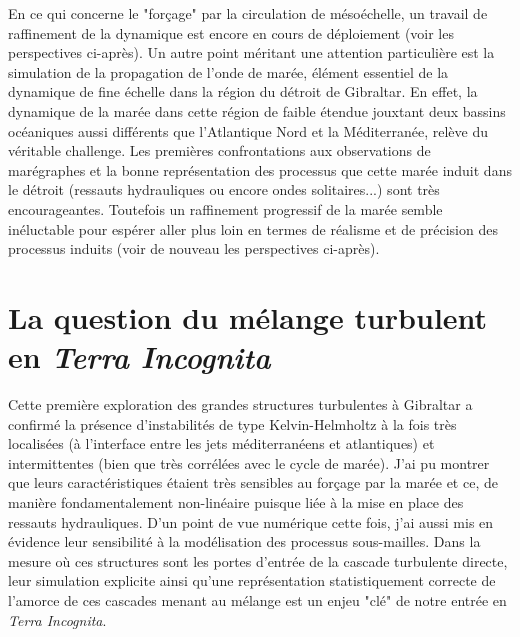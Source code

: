 En ce qui concerne le "forçage" par la circulation de mésoéchelle, un travail de raffinement de la dynamique est encore en cours de déploiement (voir les perspectives ci-après). Un autre point méritant une attention particulière est la simulation de la propagation de l'onde de marée, élément essentiel de la dynamique de fine échelle dans la région du détroit de Gibraltar. En effet, la dynamique de la marée dans cette région de faible étendue jouxtant deux bassins océaniques aussi différents que l'Atlantique Nord et la Méditerranée, relève du véritable challenge. Les premières confrontations aux observations de marégraphes et la bonne représentation des processus que cette marée induit dans le détroit (ressauts hydrauliques ou encore ondes solitaires...) sont très encourageantes. Toutefois un raffinement progressif de la marée semble inéluctable pour espérer aller plus loin en termes de réalisme et de précision des processus induits (voir de nouveau les perspectives ci-après).

\section{La question du mélange turbulent en \textit{Terra Incognita}}
Cette première exploration des grandes structures turbulentes à Gibraltar a confirmé la présence d'instabilités de type Kelvin-Helmholtz à la fois très localisées (à l'interface entre les jets méditerranéens et atlantiques) et intermittentes (bien que très corrélées avec le cycle de marée). J'ai pu montrer que leurs caractéristiques étaient très sensibles au forçage par la marée et ce, de manière fondamentalement non-linéaire puisque liée à la mise en place des ressauts hydrauliques. D'un point de vue numérique cette fois, j'ai aussi mis en évidence leur sensibilité à la modélisation des processus sous-mailles.
Dans la mesure où ces structures sont les portes d'entrée de la cascade turbulente directe, leur simulation explicite ainsi qu'une représentation statistiquement correcte de l'amorce de ces cascades menant au mélange est un enjeu "clé" de notre entrée en \textit{Terra Incognita}.



